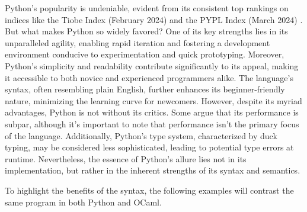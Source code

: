\documentclass{l4proj}
\begin{document}


Python's popularity is undeniable, evident from its consistent top rankings on indices like the Tiobe Index (February 2024) and the PYPL Index (March 2024) .
But what makes Python so widely favored? One of its key strengths lies in its unparalleled agility, enabling rapid iteration and fostering a development environment conducive to experimentation and quick prototyping.
Moreover, Python's simplicity and readability contribute significantly to its appeal, making it accessible to both novice and experienced programmers alike.
The language's syntax, often resembling plain English, further enhances its beginner-friendly nature, minimizing the learning curve for newcomers.
However, despite its myriad advantages, Python is not without its critics.
Some argue that its performance is subpar, although it's important to note that performance isn't the primary focus of the language.
Additionally, Python's type system, characterized by duck typing, may be considered less sophisticated, leading to potential type errors at runtime.
Nevertheless, the essence of Python's allure lies not in its implementation, but rather in the inherent strengths of its syntax and semantics.

To highlight the benefits of the syntax, the following examples will contrast the same program in both Python and OCaml.


\end{document}
